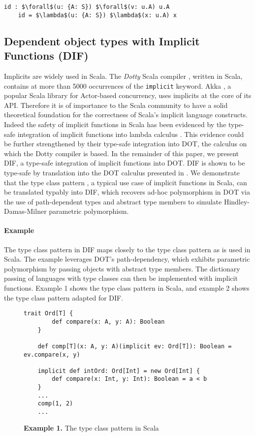 \begin{minipage}{\linewidth}
\begin{lstlisting}[mathescape]
    id : $\forall$(u: {A: S}) $\forall$(v: u.A) u.A
    id = $\lambda$(u: {A: S}) $\lambda$(x: u.A) x
\end{lstlisting}
\end{minipage}

\subsection{Dependent object types with Implicit Functions (DIF)}
Implicits are widely used in Scala. The \emph{Dotty} Scala compiler \cite{O17},
written in Scala, contains at more than 5000 occurrences of the
\texttt{implicit} keyword. Akka \cite{H12}, a popular Scala library for
Actor-based concurrency, uses implicits at the core of its API. Therefore it is
of importance to the Scala community to have a solid theoretical foundation for
the correctness of Scala's implicit language constructs. Indeed the safety of
implicit functions in Scala has been evidenced by the type-safe integration of
implicit functions into lambda calculus \cite{OBLB18}. This evidence could be
further strengthened by their type-safe integration into DOT, the calculus on
which the Dotty compiler is based. In the remainder of this paper, we present
DIF, a type-safe integration of implicit functions into DOT. DIF is shown to be
type-safe by translation into the DOT calculus presented in \cite{AGORS16}. We
demonstrate that the type class pattern \cite{OMO10}, a typical use case of
implicit functions in Scala, can be translated typably into DIF, which recovers
ad-hoc polymorphism in DOT via the use of path-dependent types and abstract type
members to simulate Hindley-Damas-Milner parametric polymorphism.

\paragraph{Example} The type class pattern \cite{OBLB18} in DIF maps closely to
the type class pattern as is used in Scala. The example leverages DOT's
path-dependency, which exhibits parametric polymorphism by passing objects with
abstract type members. The dictionary passing of languages with type classes can
then be implemented with implicit functions. Example 1 shows the type class
pattern in Scala, and example 2 shows the type class pattern adapted for DIF.

\begin{figure*}[h]
\begin{lstlisting}[mathescape]
    trait Ord[T] {
        def compare(x: A, y: A): Boolean
    }

    def comp[T](x: A, y: A)(implicit ev: Ord[T]): Boolean = ev.compare(x, y)

    implicit def intOrd: Ord[Int] = new Ord[Int] {
        def compare(x: Int, y: Int): Boolean = a < b
    }
    ...
    comp(1, 2)
    ...
\end{lstlisting}
\caption*{\textbf{Example 1.} The type class pattern in Scala}
\end{figure*}

